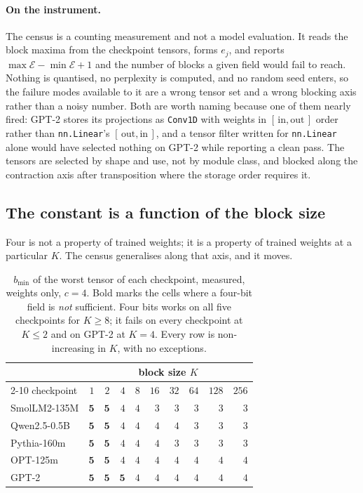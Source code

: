 \documentclass[11pt]{article}
\theoremstyle{definition}
\begin{document}
\paragraph{On the instrument.} The census is a counting measurement and not a
model evaluation. It reads the block maxima from the checkpoint tensors, forms
$e_j$, and reports $\max \mathcal{E} - \min \mathcal{E} + 1$ and the number of
blocks a given field would fail to reach. Nothing is quantised, no perplexity is
computed, and no random seed enters, so the failure modes available to it are a
wrong tensor set and a wrong blocking axis rather than a noisy number. Both are
worth naming because one of them nearly fired: GPT-2 stores its projections as
\texttt{Conv1D} with weights in $[\,\mathrm{in},\mathrm{out}\,]$ order rather
than \texttt{nn.Linear}'s $[\,\mathrm{out},\mathrm{in}\,]$, and a tensor filter
written for \texttt{nn.Linear} alone would have selected nothing on GPT-2 while
reporting a clean pass. The tensors are selected by shape and use, not by module
class, and blocked along the contraction axis after transposition where the
storage order requires it.

\subsection{The constant is a function of the block size}
\label{sec:widthk}

Four is not a property of trained weights; it is a property of trained weights at
a particular $K$. The census generalises along that axis, and it moves.

\begin{table}[t]\centering
\caption{$b_{\min}$ of the worst tensor of each checkpoint, measured, weights
only, $c=4$. Bold marks the cells where a four-bit field is \emph{not}
sufficient. Four bits works on all five checkpoints for $K \ge 8$; it fails on
every checkpoint at $K \le 2$ and on GPT-2 at $K = 4$. Every row is
non-increasing in $K$, with no exceptions.}
\label{tab:kdep}
\begin{tabular}{lrrrrrrrrr}
\toprule
 & \multicolumn{9}{c}{block size $K$} \\
\cmidrule(l){2-10}
checkpoint & $1$ & $2$ & $4$ & $8$ & $16$ & $32$ & $64$ & $128$ & $256$ \\
\midrule
SmolLM2-135M & $\mathbf{5}$ & $\mathbf{5}$ & $4$ & $4$ & $3$ & $3$ & $3$ & $3$ & $3$ \\
Qwen2.5-0.5B & $\mathbf{5}$ & $\mathbf{5}$ & $4$ & $4$ & $4$ & $4$ & $3$ & $3$ & $3$ \\
Pythia-160m  & $\mathbf{5}$ & $\mathbf{5}$ & $4$ & $4$ & $4$ & $3$ & $3$ & $3$ & $3$ \\
OPT-125m     & $\mathbf{5}$ & $\mathbf{5}$ & $4$ & $4$ & $4$ & $4$ & $4$ & $4$ & $4$ \\
GPT-2        & $\mathbf{5}$ & $\mathbf{5}$ & $\mathbf{5}$ & $4$ & $4$ & $4$ & $4$ & $4$ & $4$ \\
\bottomrule
\end{tabular}
\end{table}
\end{document}
